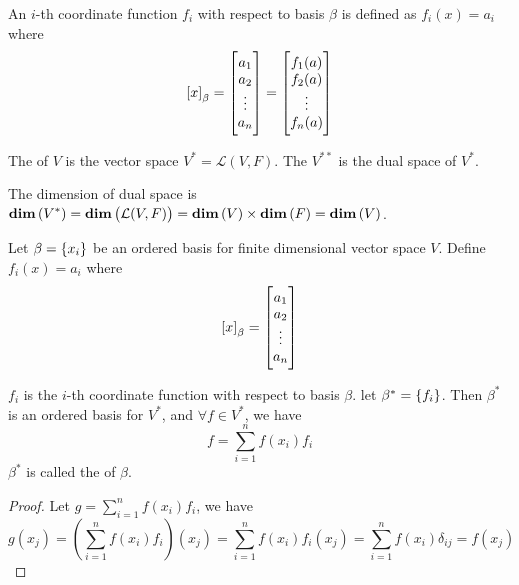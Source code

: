 \begin{definition}
	An $i$-th coordinate function $f_i$ with respect to basis $\beta$ is defined as $f_i(x) = a_i$ where
	\begin{equation*}
		\coordinate{x}_\beta = \begin{bmatrix}
			a_1 \\
			a_2 \\
			\vdots \\
			a_n
		\end{bmatrix} = \begin{bmatrix}
			f_1(a) \\
			f_2(a) \\
			\vdots \\
			f_n(a)
		\end{bmatrix}
	\end{equation*}
\end{definition}



\begin{definition}
	The \label{dualspacedefinition} of $V$ is the vector space $V^* = \mathcal{L}(V,F)$. The  $V^{**}$ is the dual space of $V^*$.
\end{definition}


The dimension of dual space is $\displaystyle \mathbf{dim}\left( V^* \right) = \displaystyle \mathbf{dim}\left( \mathcal{L}(V,F) \right) = \displaystyle \mathbf{dim}\left( V \right) \times \displaystyle \mathbf{dim}\left( F \right) = \displaystyle \mathbf{dim}\left( V \right)$.

\begin{definition}
	Let $\beta = \set{x_i}$ be an ordered basis for finite dimensional vector space $V$. Define $f_i (x) = a_i$ where
	\begin{equation*}
	    \coordinate{x}_\beta = \begin{bmatrix}
	        a_1 \\
	        a_2 \\
	        \vdots \\
	        a_n
	    \end{bmatrix}
	\end{equation*}
	
	$f_i$ is the $i$-th coordinate function with respect to basis $\beta$. let $\beta^*=\set{f_i}$. Then $\beta^*$ is an ordered basis for $V^*$, and $\forall f \in V^*$, we have
	\begin{equation}
		f = \sum_{i=1}^n f(x_i) f_i
	\end{equation}
	$\beta^*$ is called the  of $\beta$.
\end{definition}
\begin{proof}
	Let $g =\displaystyle \sum_{i=1}^n f(x_i) f_i$, we have
	\begin{equation*}
	g(x_j) = \left( \sum_{i=1}^n f(x_i) f_i \right) (x_j) = \sum_{i=1}^n f(x_i) f_i (x_j) = \sum_{i=1}^n f(x_i) \delta_{ij} =f(x_j)
	\end{equation*}
\end{proof}


